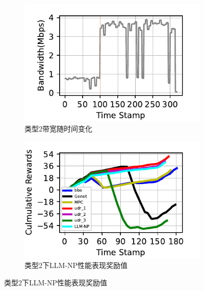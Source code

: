 \begin{figure}[ht]
\begin{subfigure}[t]{0.47\linewidth}
  \centering
  \includegraphics[width=\linewidth]{figures/chap04/evaluation_multialgo/bandwidth_27_plot.pdf}
  \caption{类型2带宽随时间变化}
  \label{type2-band-eva}
\end{subfigure}%
\begin{subfigure}[t]{0.47\linewidth}
  \centering
  \includegraphics[width=\linewidth]{figures/chap04/evaluation_multialgo/test_27_plot.pdf}
  \caption{类型2下LLM-NP性能表现奖励值}
  \label{type2-rew-eva}
\end{subfigure}


\end{figure}
